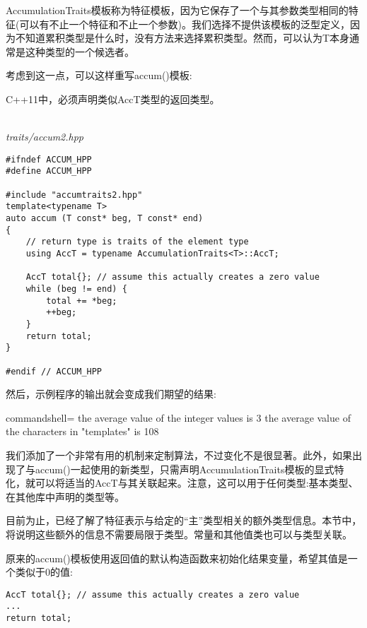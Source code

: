 AccumulationTraits模板称为特征模板，因为它保存了一个与其参数类型相同的特征(可以有不止一个特征和不止一个参数)。我们选择不提供该模板的泛型定义，因为不知道累积类型是什么时，没有方法来选择累积类型。然而，可以认为T本身通常是这种类型的一个候选者。

考虑到这一点，可以这样重写accum()模板:

\begin{tcolorbox}[colback=webgreen!5!white,colframe=webgreen!75!black]
\hspace*{0.75cm}C++11中，必须声明类似AccT类型的返回类型。
\end{tcolorbox}

\hspace*{\fill} \\ %
\noindent
\textit{traits/accum2.hpp}
\begin{lstlisting}[style=styleCXX]
#ifndef ACCUM_HPP
#define ACCUM_HPP

#include "accumtraits2.hpp"
template<typename T>
auto accum (T const* beg, T const* end)
{
	// return type is traits of the element type
	using AccT = typename AccumulationTraits<T>::AccT;
	
	AccT total{}; // assume this actually creates a zero value
	while (beg != end) {
		total += *beg;
		++beg;
	}
	return total;
}

#endif // ACCUM_HPP
\end{lstlisting}

然后，示例程序的输出就会变成我们期望的结果:

\begin{tcblisting}{commandshell={}}
the average value of the integer values is 3
the average value of the characters in "templates" is 108
\end{tcblisting}

我们添加了一个非常有用的机制来定制算法，不过变化不是很显著。此外，如果出现了与accum()一起使用的新类型，只需声明AccumulationTraits模板的显式特化，就可以将适当的AccT与其关联起来。注意，这可以用于任何类型:基本类型、在其他库中声明的类型等。


目前为止，已经了解了特征表示与给定的“主”类型相关的额外类型信息。本节中，将说明这些额外的信息不需要局限于类型。常量和其他值类也可以与类型关联。

原来的accum()模板使用返回值的默认构造函数来初始化结果变量，希望其值是一个类似于0的值:

\begin{lstlisting}[style=styleCXX]
AccT total{}; // assume this actually creates a zero value
...
return total;
\end{lstlisting}

